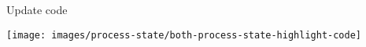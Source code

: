 

\begin{frame}{Update code}%
\vspace*{-3mm}%
\begin{center}%
\texttt{[image: images/process-state/both-process-state-highlight-code]}%
\end{center}%
\end{frame}

